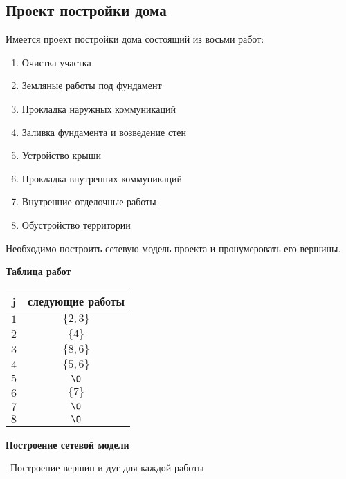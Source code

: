 \subsection{Проект постройки дома}\label{proj:house_building_project}


Имеется проект постройки дома состоящий из восьми работ:

\bigskip

\begin{enumerate}[nosep]
	\item Очистка участка
	\item Земляные работы под фундамент
	\item Прокладка наружных коммуникаций
	\item Заливка фундамента и возведение стен
	\item Устройство крыши
	\item Прокладка внутренних коммуникаций
	\item Внутренние отделочные работы
	\item Обустройство территории
\end{enumerate}

\bigskip

Необходимо построить сетевую модель проекта и пронумеровать его вершины.

\bigskip

\textbf{Таблица работ}

\begin{table}[H]
	\centering
	\begin{tabular}{ | c | c | } 
		\hline
		j & следующие работы \\\hline
		$1$ & $\{2,3\}$ \\\hline
		$2$ & $\{4\}$ \\\hline
		$3$ & $\{8,6\}$ \\\hline
		$4$ & $\{5,6\}$ \\\hline
		$5$ & $\O$ \\\hline
		$6$ & $\{7\}$ \\\hline
		$7$ & $\O$ \\\hline
		$8$ & $\O$ \\\hline
	\end{tabular}
\end{table}

\bigskip

\textbf{Построение сетевой модели}

 $\,$ Построение вершин и дуг для каждой работы

